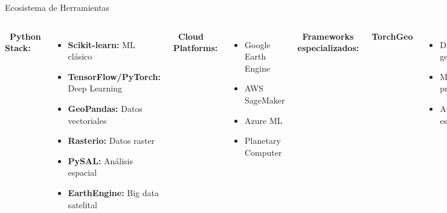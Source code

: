 \documentclass[10pt,aspectratio=169]{beamer}
\begin{document}
\begin{frame}{Ecosistema de Herramientas}
    \begin{columns}
        \textbf{\faPython\ Python Stack:}
        \begin{itemize}
            \item \textbf{Scikit-learn:} ML clásico
            \item \textbf{TensorFlow/PyTorch:} Deep Learning
            \item \textbf{GeoPandas:} Datos vectoriales
            \item \textbf{Rasterio:} Datos raster
            \item \textbf{PySAL:} Análisis espacial
            \item \textbf{EarthEngine:} Big data satelital
        \end{itemize}

        \vspace{3mm}
        \textbf{\faCloud\ Cloud Platforms:}
        \begin{itemize}
            \item Google Earth Engine
            \item AWS SageMaker
            \item Azure ML
            \item Planetary Computer
        \end{itemize}

        \textbf{\faCode\ Frameworks especializados:}

        \vspace{2mm}
        \colorbox{blue!20}{\textbf{TorchGeo}}
        \begin{itemize}
            \item Datasets geoespaciales
            \item Modelos preentrenados
            \item Augmentation espacial
        \end{itemize}

        \vspace{2mm}
        \colorbox{green!20}{\textbf{Raster Vision}}
        \begin{itemize}
            \item Pipeline completo
            \item Chips generation
            \item Model zoo
        \end{itemize}

        \vspace{2mm}
        \colorbox{red!20}{\textbf{GDAL/OGR}}
        \begin{itemize}
            \item Procesamiento raster/vector
            \item Transformaciones CRS
            \item I/O formatos
        \end{itemize}
    \end{columns}
\end{frame}
\end{document}
